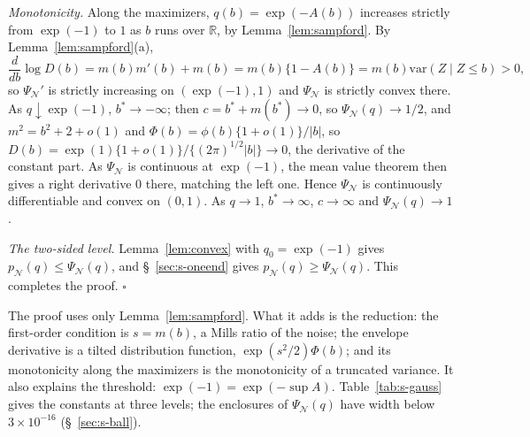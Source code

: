 \documentclass[12pt]{article}
\renewcommand{\_}{\usc\allowbreak}
\theoremstyle{definition}
\numberwithin{equation}{section}
\newcommand{\N}{\mathcal{N}}
\newcommand{\var}{\mathrm{var}}
\begin{document}
\emph{Monotonicity.} Along the maximizers, $q(b) = \exp(-A(b))$ increases strictly from $\exp(-1)$ to $1$ as $b$ runs over $\mathbb R$, by Lemma~\ref{lem:sampford}. By Lemma~\ref{lem:sampford}(a),
\[
\frac{d}{db}\log D(b) = m(b)m'(b) + m(b) = m(b)\{1 - A(b)\} = m(b)\var(Z \mid Z \le b) > 0,
\]
so $\Psi_{\N}'$ is strictly increasing on $(\exp(-1), 1)$ and $\Psi_{\N}$ is strictly convex there. As $q \downarrow \exp(-1)$, $b^* \to -\infty$; then $c = b^* + m(b^*) \to 0$, so $\Psi_{\N}(q) \to 1/2$, and $m^2 = b^2 + 2 + o(1)$ and $\Phi(b) = \phi(b)\{1 + o(1)\}/|b|$, so $D(b) = \exp(1)\{1 + o(1)\}/\{(2\pi)^{1/2}|b|\} \to 0$, the derivative of the constant part. As $\Psi_{\N}$ is continuous at $\exp(-1)$, the mean value theorem then gives a right derivative $0$ there, matching the left one. Hence $\Psi_{\N}$ is continuously differentiable and convex on $(0, 1)$. As $q \to 1$, $b^* \to \infty$, $c \to \infty$ and $\Psi_{\N}(q) \to 1$.

\emph{The two-sided level.} Lemma~\ref{lem:convex} with $q_0 = \exp(-1)$ gives $p_{\N}(q) \le \Psi_{\N}(q)$, and \S~\ref{sec:s-oneend} gives $p_{\N}(q) \ge \Psi_{\N}(q)$. This completes the proof. $\square$

The proof uses only Lemma~\ref{lem:sampford}. What it adds is the reduction: the first-order condition is $s = m(b)$, a Mills ratio of the noise; the envelope derivative is a tilted distribution function, $\exp(s^2/2)\Phi(b)$; and its monotonicity along the maximizers is the monotonicity of a truncated variance. It also explains the threshold: $\exp(-1) = \exp(-\sup A)$. Table~\ref{tab:s-gauss} gives the constants at three levels; the enclosures of $\Psi_{\N}(q)$ have width below $3 \times 10^{-16}$ (\S~\ref{sec:s-ball}).
\end{document}
